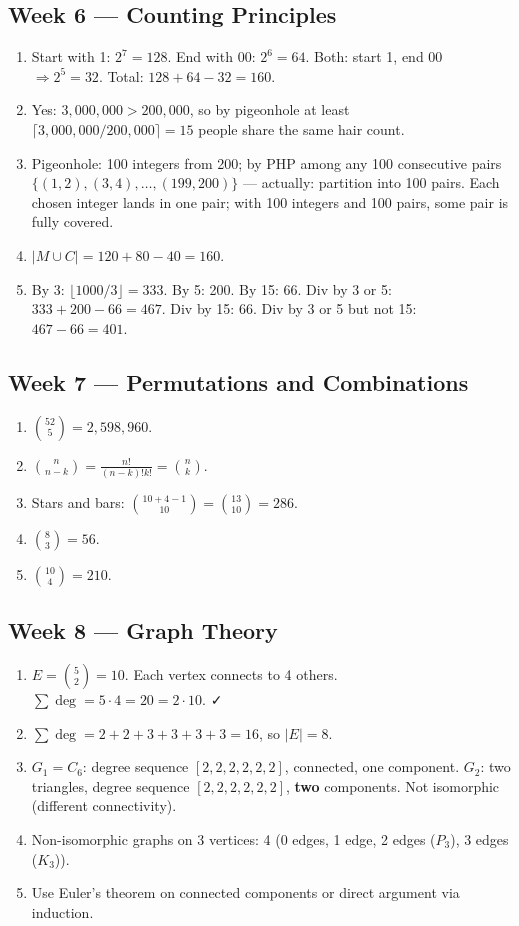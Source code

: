 \documentclass[11pt]{article}
\begin{document}
\subsection*{Week 6 — Counting Principles}
\begin{enumerate}[nosep,label=\arabic*.]
  \item Start with 1: $2^7=128$. End with 00: $2^6=64$. Both: start 1, end 00 $\Rightarrow 2^5=32$. Total: $128+64-32=160$.
  \item Yes: $3{,}000{,}000 > 200{,}000$, so by pigeonhole at least $\lceil3{,}000{,}000/200{,}000\rceil=15$ people share the same hair count.
  \item Pigeonhole: 100 integers from 200; by PHP among any 100 consecutive pairs $\{(1,2),(3,4),\ldots,(199,200)\}$ — actually: partition into 100 pairs. Each chosen integer lands in one pair; with 100 integers and 100 pairs, some pair is fully covered.
  \item $|M\cup C|=120+80-40=160$.
  \item By 3: $\lfloor1000/3\rfloor=333$. By 5: 200. By 15: 66. Div by 3 or 5: $333+200-66=467$. Div by 15: 66. Div by 3 or 5 but not 15: $467-66=401$.
\end{enumerate}

\subsection*{Week 7 — Permutations and Combinations}
\begin{enumerate}[nosep,label=\arabic*.]
  \item $\binom{52}{5}=2{,}598{,}960$.
  \item $\binom{n}{n-k}=\frac{n!}{(n-k)!k!}=\binom{n}{k}$.
  \item Stars and bars: $\binom{10+4-1}{10}=\binom{13}{10}=286$.
  \item $\binom{8}{3}=56$.
  \item $\binom{10}{4}=210$.
\end{enumerate}

\subsection*{Week 8 — Graph Theory}
\begin{enumerate}[nosep,label=\arabic*.]
  \item $E=\binom52=10$. Each vertex connects to 4 others. $\sum\deg=5\cdot4=20=2\cdot10$. ✓
  \item $\sum\deg=2+2+3+3+3+3=16$, so $|E|=8$.
  \item $G_1=C_6$: degree sequence $[2,2,2,2,2,2]$, connected, one component. $G_2$: two triangles, degree sequence $[2,2,2,2,2,2]$, \textbf{two} components. Not isomorphic (different connectivity).
  \item Non-isomorphic graphs on 3 vertices: 4 (0 edges, 1 edge, 2 edges ($P_3$), 3 edges ($K_3$)).
  \item Use Euler's theorem on connected components or direct argument via induction.
\end{enumerate}
\end{document}
